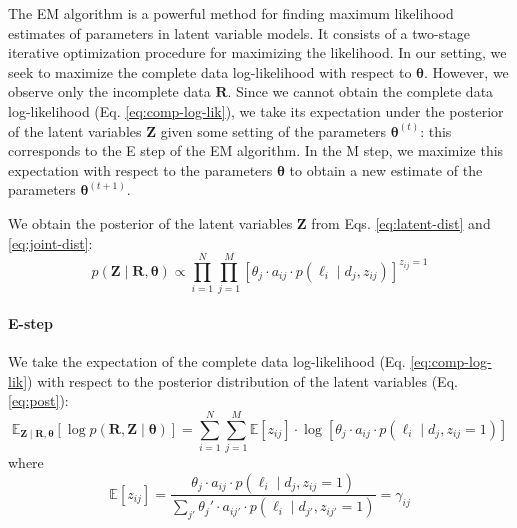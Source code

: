 The EM algorithm is a powerful method for finding maximum likelihood estimates of parameters in latent variable models. It consists of a two-stage iterative optimization procedure for maximizing the likelihood. In our setting, we seek to maximize the complete data log-likelihood with respect to $\bm{\theta}$. However, we observe only the incomplete data $\bm{R}$. Since we cannot obtain the complete data log-likelihood (Eq. \ref{eq:comp-log-lik}), we take its expectation under the posterior of the latent variables $\bm{Z}$ given some setting of the parameters $\bm{\theta}^{(t)}$: this corresponds to the E step of the EM algorithm. In the M step, we maximize this expectation with respect to the parameters $\bm{\theta}$ to obtain a new estimate of the parameters $\bm{\theta}^{(t+1)}$.   

We obtain the posterior of the latent variables $\bm{Z}$ from Eqs. \ref{eq:latent-dist} and \ref{eq:joint-dist}:
\begin{equation}
    p(\bm{Z}\mid\bm{R},\bm{\theta})\propto\prod_{i=1}^N\prod_{j=1}^M\left[\theta_j\cdot a_{ij}\cdot p(\ell_i\mid d_j,z_{ij})\right]^{z_{ij}=1}\label{eq:post}
\end{equation}
\paragraph{E-step} We take the expectation of the complete data log-likelihood (Eq. \ref{eq:comp-log-lik}) with respect to the posterior distribution of the latent variables (Eq. \ref{eq:post}):
\begin{equation}
    \mathbb{E}_{\bm{Z}\mid\bm{R},\bm{\theta}}\left[\log p(\bm{R},\bm{Z}\mid\bm{\theta})\right]=\sum_{i=1}^N\sum_{j=1}^M \mathbb{E}[z_{ij}]\cdot\log \left[\theta_j\cdot a_{ij}\cdot p(\ell_i\mid d_j, z_{ij}=1)\right]\label{eq:e-step}
\end{equation}
where 
\begin{equation}
    \mathbb{E}[z_{ij}]=\frac{\theta_j\cdot a_{ij}\cdot p(\ell_i\mid d_j, z_{ij}=1)}{\sum_{j'}\theta_j'\cdot a_{ij'}\cdot p(\ell_i\mid d_{j'}, z_{ij'}=1)}=\gamma_{ij}
\end{equation}

